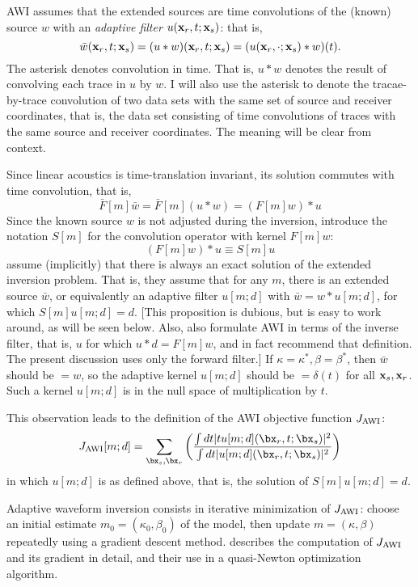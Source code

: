 AWI assumes that the extended sources are time convolutions of the
(known) source $w$ with an {\em adaptive filter} $u({\bf
  x}_r,t;{\bf x}_s)$: that is,
\[
  \bar{w}({\bf x}_r,t;{\bf x}_s) = (u * w)({\bf  x}_r,t;{\bf x}_s)
  = (u({\bf  x}_r,\cdot;{\bf x}_s)*w)(t).
\]
The asterisk denotes convolution in time. That is,
$u*w$ denotes the result of convolving each trace in $u$ by $w$. I
will also use the asterisk to denote the tracae-by-trace convolution
of two data sets with the same set of source and receiver coordinates,
that is, the data set consisting of time convolutions of traces with the same source
and receiver coordinates. The meaning will be clear from context.

Since linear acoustics is time-translation invariant, its solution commutes with time convolution, that is,
\[
 \bar{F}[m]\bar{w} = \bar{F}[m](u* w) = (F[m]w)*u
\]
Since the known source $w$ is not adjusted during the inversion, 
introduce the notation $S[m]$ for the convolution operator with kernel $F[m]w$:
\begin{equation}
  \label{eqn:sdef}
  (F[m]w)*u \equiv S[m]u
\end{equation}
\cite{Warner:16} assume (implicitly) that there is always an exact
solution of the extended inversion problem. That is, they assume that
for any $m$, there is an extended source $\bar{w}$, or equivalently an
adaptive filter $u[m;d]$ with $\bar{w}=w*u[m;d]$, for which
$S[m]u[m;d]= d$. [This proposition is dubious, but is easy to work
around, as will be seen below. Also, \cite{Warner:16} also formulate
AWI in terms of the inverse filter, that is, $u$ for which
$u*d = F[m]w$, and in fact recommend that definition. The present
discussion uses only the forward filter.] If
$\kappa = \kappa^*, \beta = \beta^*$, then $\bar{w}$ should be $= w$,
so the adaptive kernel $u[m;d]$ should be $=\delta(t)$ for all
${\bf x}_s,{\bf x}_r$. Such a kernel $u[m;d]$ is in the null space of
multiplication by $t$.

This observation leads to the definition of the AWI objective function $J_{\rm AWI}$:
\begin{equation}
  \label{eqn:tJz}
  J_{\rm AWI}[m;d] = \sum_{\bx_s,\bx_r} \left(\frac{\int dt |tu[m;d](\bx_r,t;\bx_s)|^2}{\int dt |u[m;d](\bx_r,t;\bx_s)|^2}\right)
\end{equation}
in which $u[m;d]$ is as defined above, that is, the solution of $S[m]u[m;d]
= d$.

Adaptive waveform inversion consists in iterative minimization of
$J_{\rm AWI}$: choose an initial estimate $m_0=(\kappa_0,\beta_0)$ of the
model, then update $m=(\kappa,\beta)$ repeatedly using a gradient
descent method. \cite{Warner:16} describes the computation of $J_{\rm AWI}$
and its gradient in detail, and their use in a quasi-Newton
optimization algorithm.

